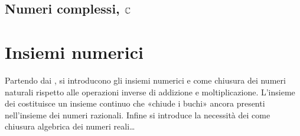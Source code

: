 \documentclass[letterpaper,10pt,italian]{jupyterBook}
\begin{document}
\subsection{Numeri complessi, \protect\(\mathbb{C}\protect\)}
\label{\detokenize{ch/set:numeri-complessi-mathbb-c}}\label{\detokenize{ch/set:math-hs-set-numbers-c}}
\sphinxstepscope


\section{Insiemi numerici}
\label{\detokenize{ch/set/numeric-sets:insiemi-numerici}}\label{\detokenize{ch/set/numeric-sets:sets-numeric}}\label{\detokenize{ch/set/numeric-sets::doc}}
\sphinxAtStartPar
Partendo dai {\hyperref[\detokenize{ch/set/numeric-sets:sets-numeric-n}]{}}, si introducono gli insiemi numerici {\hyperref[\detokenize{ch/set/numeric-sets:sets-numeric-z}]{}} e {\hyperref[\detokenize{ch/set/numeric-sets:sets-numeric-q}]{}} come chiusura dei numeri naturali rispetto alle operazioni inverse di addizione e moltiplicazione. L’insieme dei {\hyperref[\detokenize{ch/set/numeric-sets:sets-numeric-r}]{}} costituisce un insieme continuo che «chiude i buchi» ancora presenti nell’insieme dei numeri razionali. Infine si introduce la necessità dei {\hyperref[\detokenize{ch/set/numeric-sets:sets-numeric-c}]{}} come chiusura algebrica dei numeri reali…
 
\end{document}
